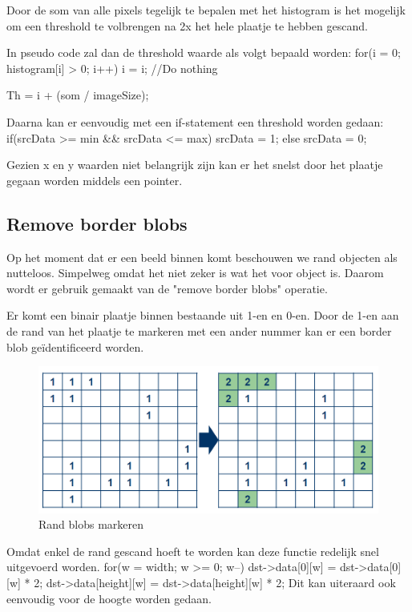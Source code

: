 Door de som van alle pixels tegelijk te bepalen met het histogram is het mogelijk 
om een threshold te volbrengen na 2x het hele plaatje te hebben gescand.

In pseudo code zal dan de threshold waarde als volgt bepaald worden:
for(i = 0; histogram[i] > 0; i++){
    i = i; //Do nothing
}

Th = i + (som / imageSize);

Daarna  kan er eenvoudig met een if-statement een threshold worden gedaan:
if(srcData >= min && srcData <= max){
    srcData = 1;
} else {
    srcData = 0;
}

Gezien x en y waarden niet belangrijk zijn kan er het snelst door het plaatje 
gegaan worden middels een pointer.

\subsection{Remove border blobs}
\label{sub:rembb}
Op het moment dat er een beeld binnen komt beschouwen we rand objecten als 
nutteloos. Simpelweg omdat het niet zeker is wat het voor object is. Daarom 
wordt er gebruik gemaakt van de "remove border blobs" operatie.

Er komt een binair plaatje binnen bestaande uit 1-en en 0-en. Door de 1-en 
aan de rand van het plaatje te markeren met een ander nummer kan er een 
border blob geïdentificeerd worden. 

\begin{figure}
    \begin{center}
        \includegraphics[scale=0.5]{figures/border_blob_step1.png}
    \end{center}
    \caption{Rand blobs markeren}
    \label{fig:bbstep1}
\end{figure}

Omdat enkel de rand gescand hoeft te worden kan deze functie redelijk snel 
uitgevoerd worden.
for(w = width; w >= 0; w--){
	dst->data[0][w]      = dst->data[0][w] * 2;
	dst->data[height][w] = dst->data[height][w] * 2;
}
Dit kan uiteraard ook eenvoudig voor de hoogte worden gedaan.

